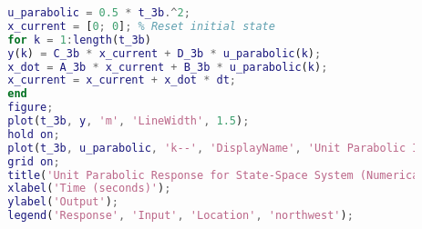 \documentclass{article}
\begin{document}
\begin{lstlisting}[language=Matlab, caption=MATLAB Code for Problem 3(b) (Numerical Integration for State-Space)]
		% --- Unit Parabolic Response (u(t) = t^2/2) ---
		u_parabolic = 0.5 * t_3b.^2;
		x_current = [0; 0]; % Reset initial state
		for k = 1:length(t_3b)
		y(k) = C_3b * x_current + D_3b * u_parabolic(k);
		x_dot = A_3b * x_current + B_3b * u_parabolic(k);
		x_current = x_current + x_dot * dt;
		end
		figure;
		plot(t_3b, y, 'm', 'LineWidth', 1.5);
		hold on;
		plot(t_3b, u_parabolic, 'k--', 'DisplayName', 'Unit Parabolic Input');
		grid on;
		title('Unit Parabolic Response for State-Space System (Numerical)');
		xlabel('Time (seconds)');
		ylabel('Output');
		legend('Response', 'Input', 'Location', 'northwest');
	\end{lstlisting}
	
\end{document}
